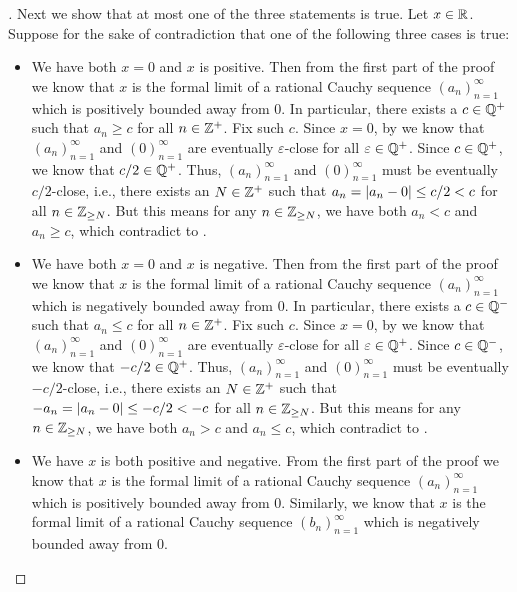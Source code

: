 \begin{proof}[]
  Next we show that at most one of the three statements is true.
  Let \(x \in \mathbb{R}\).
  Suppose for the sake of contradiction that one of the following three cases is true:
  \begin{itemize}
    \item We have both \(x = 0\) and \(x\) is positive.
          Then from the first part of the proof we know that \(x\) is the formal limit of a rational Cauchy sequence \((a_n)_{n = 1}^\infty\) which is positively bounded away from \(0\).
          In particular, there exists a \(c \in \mathbb{Q}^+\) such that \(a_n \geq c\) for all \(n \in \mathbb{Z}^+\).
          Fix such \(c\).
          Since \(x = 0\), by  we know that \((a_n)_{n = 1}^\infty\) and \((0)_{n = 1}^\infty\) are eventually \(\varepsilon\)-close for all \(\varepsilon \in \mathbb{Q}^+\).
          Since \(c \in \mathbb{Q}^+\), we know that \(c / 2 \in \mathbb{Q}^+\).
          Thus, \((a_n)_{n = 1}^\infty\) and \((0)_{n = 1}^\infty\) must be eventually \(c / 2\)-close, i.e., there exists an \(N \in \mathbb{Z}^+\) such that \(a_n = \left\lvert a_n - 0\right\rvert \leq c / 2 < c\) for all \(n \in \mathbb{Z}_{\geq N}\).
          But this means for any \(n \in \mathbb{Z}_{\geq N}\), we have both \(a_n < c\) and \(a_n \geq c\), which contradict to .
    \item We have both \(x = 0\) and \(x\) is negative.
          Then from the first part of the proof we know that \(x\) is the formal limit of a rational Cauchy sequence \((a_n)_{n = 1}^\infty\) which is negatively bounded away from \(0\).
          In particular, there exists a \(c \in \mathbb{Q}^-\) such that \(a_n \leq c\) for all \(n \in \mathbb{Z}^+\).
          Fix such \(c\).
          Since \(x = 0\), by  we know that \((a_n)_{n = 1}^\infty\) and \((0)_{n = 1}^\infty\) are eventually \(\varepsilon\)-close for all \(\varepsilon \in \mathbb{Q}^+\).
          Since \(c \in \mathbb{Q}^-\), we know that \(-c / 2 \in \mathbb{Q}^+\).
          Thus, \((a_n)_{n = 1}^\infty\) and \((0)_{n = 1}^\infty\) must be eventually \(-c / 2\)-close, i.e., there exists an \(N \in \mathbb{Z}^+\) such that \(-a_n = \left\lvert a_n - 0\right\rvert \leq -c / 2 < -c\) for all \(n \in \mathbb{Z}_{\geq N}\).
          But this means for any \(n \in \mathbb{Z}_{\geq N}\), we have both \(a_n > c\) and \(a_n \leq c\), which contradict to .
    \item We have \(x\) is both positive and negative.
          From the first part of the proof we know that \(x\) is the formal limit of a rational Cauchy sequence \((a_n)_{n = 1}^\infty\) which is positively bounded away from \(0\).
          Similarly, we know that \(x\) is the formal limit of a rational Cauchy sequence \((b_n)_{n = 1}^\infty\) which is negatively bounded away from \(0\).

\end{itemize}
\end{proof}
